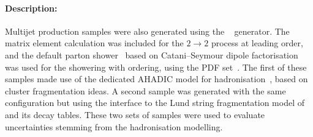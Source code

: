 \paragraph{Description:}

Multijet production samples were also generated using the \SHERPA[2.2.5]~\cite{Bothmann:2019yzt} generator. 
The matrix element calculation was included for the $2\rightarrow2$ process at leading order, and the default \SHERPA parton
shower~\cite{Schumann:2007mg} based on Catani--Seymour dipole factorisation was used for the showering with \pT
ordering, using the \CT[14nnlo] PDF set~\cite{Dulat:2015mca}.
The first of these samples made use of the dedicated \SHERPA AHADIC model for hadronisation~\cite{Winter:2003tt}, 
based on cluster fragmentation ideas. A second sample was generated with the same configuration but using the \SHERPA interface to
the Lund string fragmentation model of \PYTHIA[6]~\cite{Sjostrand:2006za} and its decay tables.  
These two sets of samples were used to evaluate uncertainties stemming from the hadronisation modelling. 

